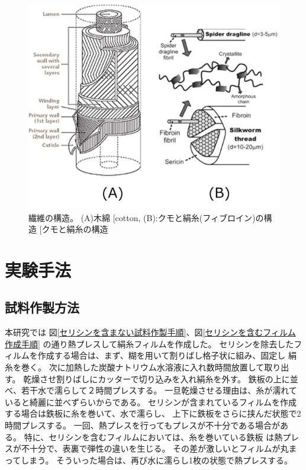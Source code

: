 \documentclass[dvipdfmx,12pt,a4paper]{jreport}
\makeatletter
\DeclareRobustCommand\cite{\unskip
    	\@ifnextchar[{\@tempswatrue\@citex}{\@tempswafalse\@citex[]}}
\makeatother
\begin{document}
			\begin{figure}[h]
				\centering
				\includegraphics[scale=0.8]{fiber_structures.jpg}
				\caption{繊維の構造。 
				(A)木綿\cite{cotton}, 
				(B):クモと絹糸(フィブロイン)の構造\cite{クモと絹糸の構造}}
			\end{figure}
	\chapter{実験手法}
		\section{試料作製方法}
		本研究では
		図\ref{セリシンを含まない試料作製手順}、図\ref{セリシンを含むフィルム作成手順}
		の通り熱プレスして絹糸フィルムを作成した。
		セリシンを除去したフィルムを作成する場合は、まず、糊を用いて割りばし格子状に組み、固定し
		絹糸を巻く。
		次に加熱した炭酸ナトリウム水溶液に入れ数時間放置して取り出す。
		乾燥させ割りばしにカッターで切り込みを入れ絹糸を外す。
		鉄板の上に並べ、若干水で濡らして２時間プレスする。
		一旦乾燥させる理由は、糸が濡れていると綺麗に並べずらいからである。
		セリシンが含まれているフィルムを作成する場合は鉄板に糸を巻いて、水で濡らし、
		上下に鉄板をさらに挟んだ状態で2時間プレスする。
		一回、熱プレスを行ってもプレスが不十分である場合がある。
		特に、セリシンを含むフィルムにおいては、糸を巻いている鉄板
		は熱プレスが不十分で、表裏で弾性の違いを生じる。
		その差が激しいとフィルムが丸まってしまう。
		そういった場合は、再び水に濡らし1枚の状態で熱プレスする。
\end{document}
